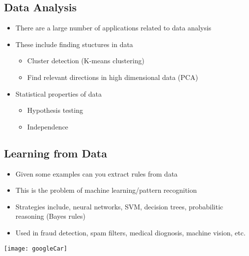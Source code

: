 \Outline %

\begin{slide}
\section{Data Analysis}

\begin{PauseHighLight}
  \begin{itemize}
  \item There are a large number of applications related to data
    analysis\pause
  \item These include finding stuctures in data\pause
    \begin{itemize}
    \item Cluster detection (K-means clustering)\pause
    \item Find relevant directions in high dimensional data (PCA)\pause
    \end{itemize}
  \item Statistical properties of data\pause
    \begin{itemize}
    \item Hypothesis testing\pause
    \item Independence\pause
    \end{itemize}
\end{itemize}
\end{PauseHighLight}

\end{slide}


\begin{slide}
\section[-2]{Learning from Data}

\begin{PauseHighLight}
  \begin{itemize}
  \item Given some examples can you extract rules from data\pause
  \item This is the problem of machine learning/pattern
    recognition\pause
  \item Strategies include, neural networks, SVM, decision trees,
    probabilitic reasoning (Bayes rules)\pause
  \item Used in fraud detection, spam filters, medical diognosis,
    machine vision, etc.
  \end{itemize}
  \begin{center}
    \texttt{[image: googleCar]}\pause
  \end{center}
\end{PauseHighLight}

\end{slide}

